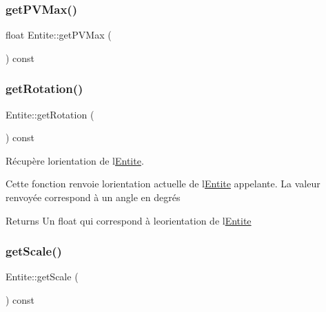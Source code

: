\subsubsection{\texorpdfstring{get\+P\+V\+Max()}{getPVMax()}}
{\footnotesize\ttfamily float Entite\+::get\+P\+V\+Max (\begin{DoxyParamCaption}{ }\end{DoxyParamCaption}) const\hspace{0.3cm}{\ttfamily [inline]}}

\mbox{\label{class_entite_a7f19439f7e7a5028f4b26eff21683de9}} 
\subsubsection{\texorpdfstring{get\+Rotation()}{getRotation()}}
{\footnotesize\ttfamily Entite\+::get\+Rotation (\begin{DoxyParamCaption}{ }\end{DoxyParamCaption}) const\hspace{0.3cm}{\ttfamily [inline]}}



Récupère l\textquotesingle{}orientation de l\textquotesingle{}\mbox{\hyperlink{class_entite}{Entite}}. 

Cette fonction renvoie l\textquotesingle{}orientation actuelle de l\textquotesingle{}\mbox{\hyperlink{class_entite}{Entite}} appelante. La valeur renvoyée correspond à un angle en degrés \begin{DoxyReturn}{Returns}
Un {\ttfamily float} qui correspond à l\textquotesingle{}eorientation de l\textquotesingle{}\mbox{\hyperlink{class_entite}{Entite}} 
\end{DoxyReturn}
\mbox{\label{class_entite_a5f70868f62049291edf4b245a531a6e0}} 
\subsubsection{\texorpdfstring{get\+Scale()}{getScale()}}
{\footnotesize\ttfamily Entite\+::get\+Scale (\begin{DoxyParamCaption}{ }\end{DoxyParamCaption}) const\hspace{0.3cm}{\ttfamily [inline]}}



